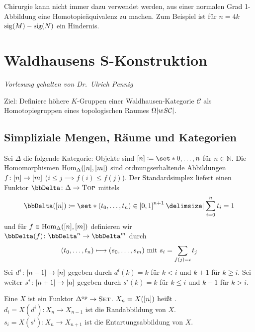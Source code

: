 \begin{bemerkung}
	Chirurgie kann nicht immer dazu verwendet werden, aus einer normalen Grad 1-Abbildung eine Homotopieäquivalenz zu machen.
	Zum Beispiel ist für $n=4k$ $\sig(M) - \sig(N)$ ein Hindernis.
\end{bemerkung}
\newpage

\section{Waldhausens S-Konstruktion} %
\label{sec:waldhausens}
\emph{Vorlesung gehalten von Dr.~Ulrich Pennig}

Ziel: Definiere höhere $K$-Gruppen einer Waldhausen-Kategorie $\mathcal{C}$ als Homotopiegruppen eines topologischen Raumes $\Omega \abs*{w S \mathcal{C}}$.

\subsection{Simpliziale Mengen, Räume und Kategorien} %
\label{sub:1}
Sei $\Delta$ die folgende Kategorie: Objekte sind $\benbrace*{n} \coloneqq \set*{0, \ldots ,n}$ für $n \in \mathbb{N}$.
Die Homomorphismen $\Hom_\Delta(\benbrace*{n}, \benbrace*{m})$ sind ordnungserhaltende Abbildungen $f \colon \benbrace*{n} \to \benbrace*{m}$ ($i\le j \implies f(i) \le f(j)$).
Der Standardsimplex liefert einen Funktor $\DDelta \colon \Delta \to \TOP$ mittels
\[
	\DDelta \enbrace*{\benbrace*{n}} \coloneqq \set*{\enbrace*{t_0, \ldots ,t_n} \in \benbrace*{0,1}^{n+1} \given \sum_{i=0}^n t_i = 1}
\]
und für $f \in \Hom_\Delta( \benbrace*{n}, \benbrace*{m})$ definieren wir $\DDelta(f) \colon \DDelta^n \to \DDelta^m$ durch 
\[
	\enbrace*{t_0, \ldots ,t_n} \longmapsto (s_0, \ldots ,s_m) \text{ mit } s_i = \sum_{f(j)=i} t_j 
\]
Sei $d^i \colon \benbrace*{n-1} \to \benbrace*{n}$ gegeben durch $d^i(k) = k$ für $k < i$ und $k+1$ für $k \ge i$.
Sei weiter $s^i \colon \benbrace*{n+1} \to \benbrace*{n}$ gegeben durch $s^i(k) = k$ für $k \le i$ und $k-1$ für $k > i$.

\begin{definition}
	Eine  $X$ ist ein Funktor $\Delta^\op \to \SET$.
	$X_n = X \enbrace*{[n]}$  heißt .
	$d_i = X(d^i) \colon X_n \to X_{n-1}$ ist die Randabbildung von $X$.
	$s_i = X(s^i) \colon X_n \to X_{n+1}$ ist die Entartungsabbildung von $X$.
\end{definition}

